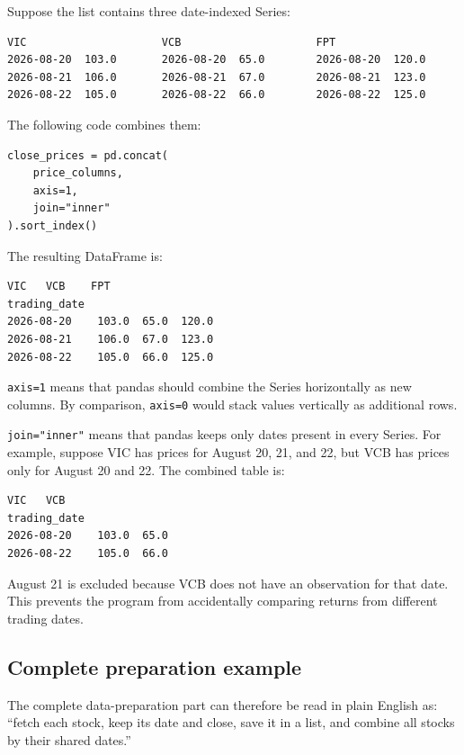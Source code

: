 \documentclass[11pt,a4paper]{article}
\begin{document}
Suppose the list contains three date-indexed Series:

\begin{lstlisting}[style=terminal]
VIC                     VCB                     FPT
2026-08-20  103.0       2026-08-20  65.0        2026-08-20  120.0
2026-08-21  106.0       2026-08-21  67.0        2026-08-21  123.0
2026-08-22  105.0       2026-08-22  66.0        2026-08-22  125.0
\end{lstlisting}

The following code combines them:

\begin{lstlisting}[style=python]
close_prices = pd.concat(
    price_columns,
    axis=1,
    join="inner"
).sort_index()
\end{lstlisting}

The resulting DataFrame is:

\begin{lstlisting}[style=terminal]
                VIC   VCB    FPT
trading_date
2026-08-20    103.0  65.0  120.0
2026-08-21    106.0  67.0  123.0
2026-08-22    105.0  66.0  125.0
\end{lstlisting}

\texttt{axis=1} means that pandas should combine the Series horizontally as
new columns. By comparison, \texttt{axis=0} would stack values vertically as
additional rows.

\texttt{join="inner"} means that pandas keeps only dates present in every
Series. For example, suppose VIC has prices for August 20, 21, and 22, but VCB
has prices only for August 20 and 22. The combined table is:

\begin{lstlisting}[style=terminal]
                VIC   VCB
trading_date
2026-08-20    103.0  65.0
2026-08-22    105.0  66.0
\end{lstlisting}

August 21 is excluded because VCB does not have an observation for that date.
This prevents the program from accidentally comparing returns from different
trading dates.

\subsection{Complete preparation example}

The complete data-preparation part can therefore be read in plain English as:
``fetch each stock, keep its date and close, save it in a list, and combine all
stocks by their shared dates.''
\end{document}
